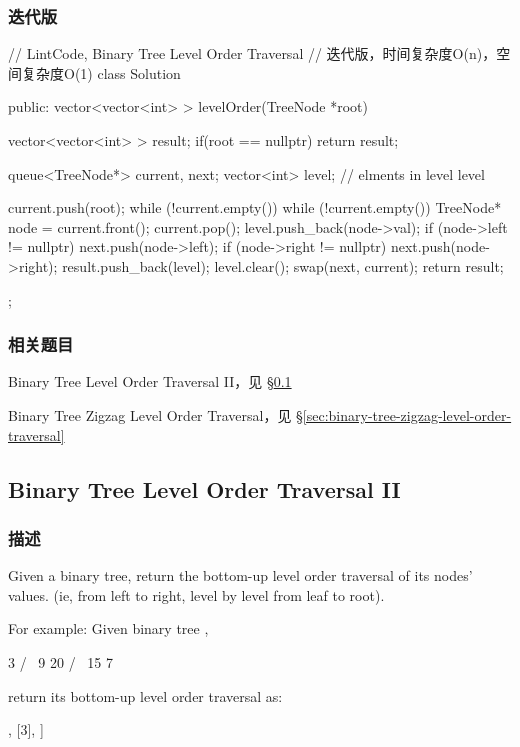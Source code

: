 \subsubsection{迭代版}
\begin{Code}
// LintCode, Binary Tree Level Order Traversal
// 迭代版，时间复杂度O(n)，空间复杂度O(1)
class Solution {
public:
    vector<vector<int> > levelOrder(TreeNode *root) {
        vector<vector<int> > result;
        if(root == nullptr) return result;

        queue<TreeNode*> current, next;
        vector<int> level; // elments in level level

        current.push(root);
        while (!current.empty()) {
            while (!current.empty()) {
                TreeNode* node = current.front();
                current.pop();
                level.push_back(node->val);
                if (node->left != nullptr) next.push(node->left);
                if (node->right != nullptr) next.push(node->right);
            }
            result.push_back(level);
            level.clear();
            swap(next, current);
        }
        return result;
    }
};
\end{Code}


\subsubsection{相关题目}
\begindot
\item Binary Tree Level Order Traversal II，见 \S \ref{sec:binary-tree-tevel-order-traversal-ii}
\item Binary Tree Zigzag Level Order Traversal，见 \S \ref{sec:binary-tree-zigzag-level-order-traversal}
\myenddot


\subsection{Binary Tree Level Order Traversal II}
\label{sec:binary-tree-tevel-order-traversal-ii}


\subsubsection{描述}
Given a binary tree, return the bottom-up level order traversal of its nodes' values. (ie, from left to right, level by level from leaf to root).

For example:
Given binary tree ,
\begin{Code}
    3
   / \
  9  20
    /  \
   15   7
\end{Code}
return its bottom-up level order traversal as:
\begin{Code}
[
  [15,7]
  [9,20],
  [3],
]
\end{Code}


